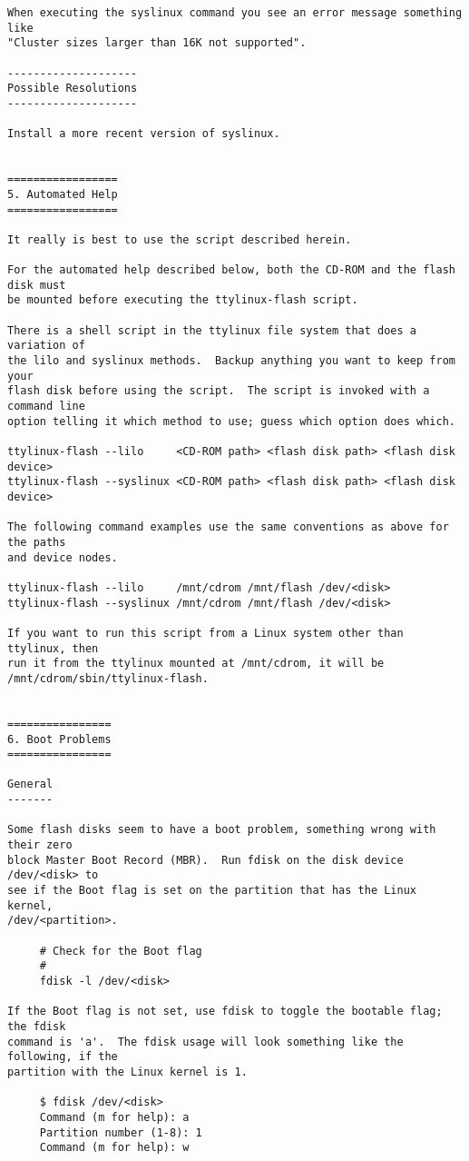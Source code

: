 \documentclass[10pt]{article}
\begin{document}
\begin{lstlisting}
When executing the syslinux command you see an error message something like
"Cluster sizes larger than 16K not supported".

--------------------
Possible Resolutions
--------------------

Install a more recent version of syslinux.


=================
5. Automated Help
=================

It really is best to use the script described herein.

For the automated help described below, both the CD-ROM and the flash disk must
be mounted before executing the ttylinux-flash script.

There is a shell script in the ttylinux file system that does a variation of
the lilo and syslinux methods.  Backup anything you want to keep from your
flash disk before using the script.  The script is invoked with a command line
option telling it which method to use; guess which option does which.

ttylinux-flash --lilo     <CD-ROM path> <flash disk path> <flash disk device>
ttylinux-flash --syslinux <CD-ROM path> <flash disk path> <flash disk device>

The following command examples use the same conventions as above for the paths
and device nodes.

ttylinux-flash --lilo     /mnt/cdrom /mnt/flash /dev/<disk>
ttylinux-flash --syslinux /mnt/cdrom /mnt/flash /dev/<disk>

If you want to run this script from a Linux system other than ttylinux, then
run it from the ttylinux mounted at /mnt/cdrom, it will be
/mnt/cdrom/sbin/ttylinux-flash.


================
6. Boot Problems
================

General
-------

Some flash disks seem to have a boot problem, something wrong with their zero
block Master Boot Record (MBR).  Run fdisk on the disk device /dev/<disk> to
see if the Boot flag is set on the partition that has the Linux kernel,
/dev/<partition>.

     # Check for the Boot flag
     #
     fdisk -l /dev/<disk>

If the Boot flag is not set, use fdisk to toggle the bootable flag; the fdisk
command is 'a'.  The fdisk usage will look something like the following, if the
partition with the Linux kernel is 1.

     $ fdisk /dev/<disk>
     Command (m for help): a
     Partition number (1-8): 1
     Command (m for help): w


\end{lstlisting}
\end{document}
